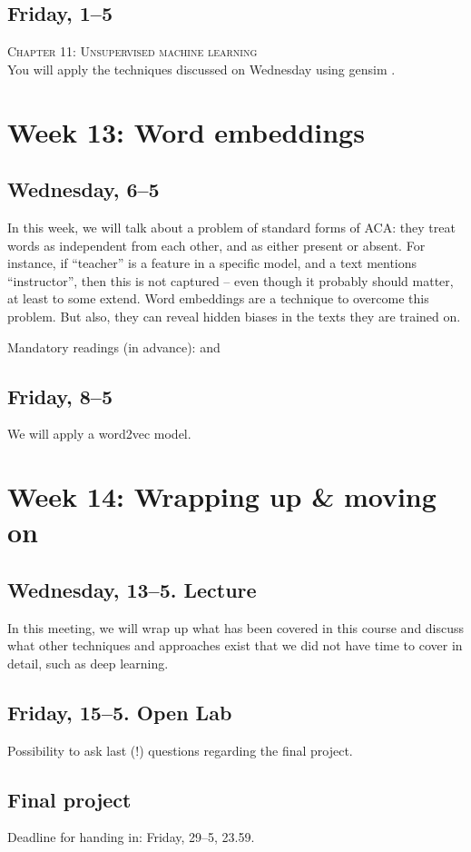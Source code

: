 \subsection*{Friday, 1--5}
\textsc{ Chapter 11: Unsupervised machine learning}\\
You will apply the techniques discussed on Wednesday using gensim \citep{Rehurek2010}.



\section*{Week 13: Word embeddings}

\subsection*{Wednesday, 6--5}
In this week, we will talk about a problem of standard forms of ACA: they treat words as independent from each other, and as either present or absent. For instance, if ``teacher'' is a feature in a specific model, and a text mentions ``instructor'', then this is not captured -- even though it probably should matter, at least to some extend. Word embeddings are a technique to overcome this problem. But also, they can reveal hidden biases in the texts they are trained on.

Mandatory readings (in advance): \cite{Kusner2015} and \cite{Garg2017}



\subsection*{Friday, 8--5}
We will apply a word2vec model.



\section*{Week 14: Wrapping up \& moving on}

\subsection*{Wednesday, 13--5. Lecture}
In this meeting, we will wrap up what has been covered in this course and discuss what other techniques and approaches exist that we did not have time to cover in detail, such as deep learning. 

\subsection*{Friday, 15--5. Open Lab}
Possibility to ask last (!) questions regarding the final project.

\subsection*{Final project}
Deadline for handing in: Friday, 29--5, 23.59.